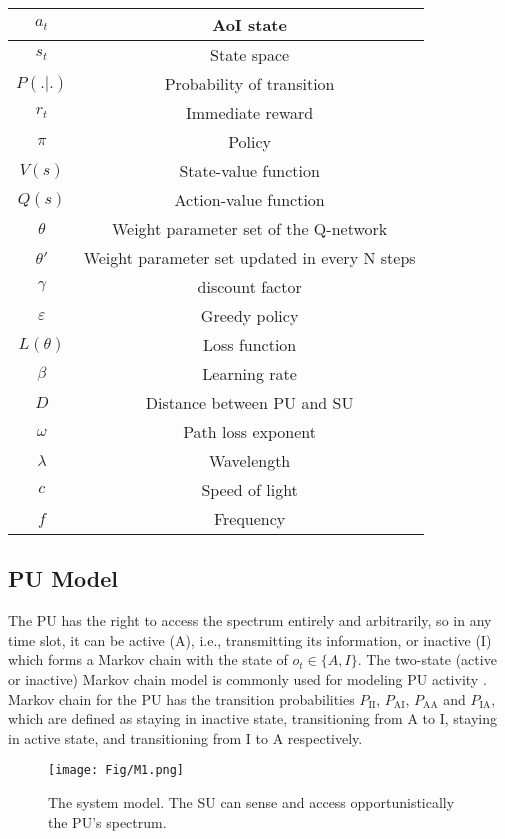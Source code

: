 \documentclass[journal]{IEEEtran}
\begin{document}
\begin{table}[!t]
\begin{tabular}{|c|c|}
				$a_{t}$ & AoI state\\
				\hline
				$s_{t}$ & State space\\
				\hline
				$P(.|.)$ & Probability of transition\\
				\hline
				$r_{t}$ & Immediate reward\\
				\hline
				$\pi$ & Policy\\
				\hline
				$V(s)$ & State-value function\\
				\hline
				$Q(s)$ & Action-value function\\
				\hline
				$\theta$ & Weight parameter set of the Q-network\\
				\hline
				${\theta '}$ & Weight parameter set updated in every N steps\\
				\hline
				$\gamma$ & discount factor\\
				\hline
				$\varepsilon$ & Greedy policy\\
				\hline
				$L(\theta)$ & Loss function\\
				\hline
				$\beta$ & Learning rate\\
				\hline
				$D$ & Distance between PU and SU\\
				\hline
				$\omega$ & Path loss exponent\\
				\hline
				$\lambda$ & Wavelength\\
				\hline
				$c$ & Speed of light\\
				\hline
				$f$ & Frequency\\
				\hline
			\end{tabular}
		\end{table}

	\subsection{PU Model}
		The PU has the right to access the spectrum entirely and arbitrarily, so in any time slot, it can be active (A), i.e., transmitting its information, or inactive (I) which forms a Markov chain with the state of $o_t\in \{A, I\}$. The two-state (active or inactive) Markov chain model is commonly used for modeling PU activity \cite{Primary_23}. Markov chain for the PU has the transition probabilities $P_{\text{II}}$, $P_{\text{AI}}$, $P_{\text{AA}}$ and $P_{\text{IA}}$, which are defined as staying in inactive state, transitioning from A to I, staying in active state, and transitioning from I to A respectively.
		
		\begin{figure}[!t]
			\centering
			\texttt{[image: Fig/M1.png]}
			\caption{The system model. The SU can sense and access
				opportunistically the PU’s spectrum.}
			\label{System Model}
		\end{figure}
\end{document}
